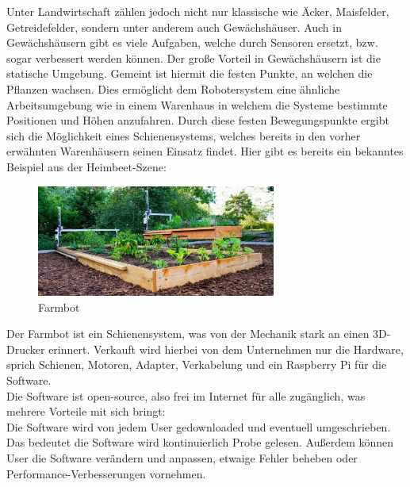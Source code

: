 Unter Landwirtschaft zählen jedoch nicht nur klassische wie Äcker, Maisfelder, Getreidefelder, sondern unter anderem auch Gewächshäuser.
Auch in Gewächshäusern gibt es viele Aufgaben, welche durch Sensoren ersetzt, bzw. sogar verbessert werden können.
Der große Vorteil in Gewächshäusern ist die statische Umgebung.
Gemeint ist hiermit die festen Punkte, an welchen die Pflanzen wachsen. 
Dies ermöglicht dem Robotersystem eine ähnliche Arbeitsumgebung wie in einem Warenhaus in welchem die Systeme bestimmte Positionen und Höhen anzufahren.
Durch diese festen Bewegungspunkte ergibt sich die Möglichkeit eines Schienensystems, welches bereits in den vorher erwähnten Warenhäusern seinen Einsatz findet.
Hier gibt es bereits ein bekanntes Beispiel aus der Heimbeet-Szene:\\

\begin{figure}[ht]
	\centering
	\includegraphics[width=0.7\textwidth]{bilder/farmbot.png}
	\caption[Farmbot]{Farmbot}
	\label{fig:farmbot}
\end{figure}

Der Farmbot ist ein Schienensystem, was von der Mechanik stark an einen 3D-Drucker erinnert.
Verkauft wird hierbei von dem Unternehmen nur die Hardware, sprich Schienen, Motoren, Adapter, Verkabelung und ein Raspberry Pi für die Software.\\
Die Software ist open-source, also frei im Internet für alle zugänglich, was mehrere Vorteile mit sich bringt:\\
Die Software wird von jedem User gedownloaded und eventuell umgeschrieben. Das bedeutet die Software wird kontinuierlich Probe gelesen.
Außerdem können User die Software verändern und anpassen, etwaige Fehler beheben oder Performance-Verbesserungen vornehmen.